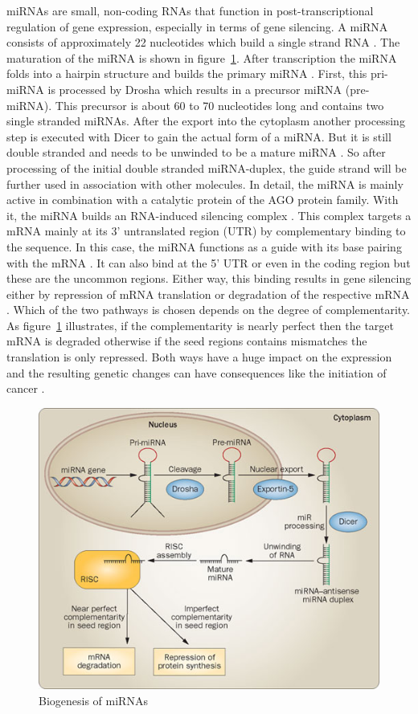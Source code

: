 \documentclass[12pt]{article}
\begin{document}
miRNAs are small, non-coding RNAs that function in post-transcriptional regulation of gene expression, especially in terms of gene silencing. A miRNA consists of approximately 22 nucleotides which build a single strand RNA \cite{Bartel}. The maturation of the miRNA is shown in figure~\ref{biogenesis}. After transcription the miRNA folds into a hairpin structure and builds the primary miRNA \cite{Macfarlane}. First, this pri-miRNA is processed by Drosha which results in a precursor miRNA (pre-miRNA). This precursor is about 60 to 70 nucleotides long and contains two single stranded miRNAs. After the export into the cytoplasm another processing step is executed with Dicer to gain the actual form of a miRNA. But it is still double stranded and needs to be unwinded to be a mature miRNA \cite{Macfarlane}. So after processing of the initial double stranded miRNA-duplex, the guide strand will be further used in association with other molecules. In detail, the miRNA is mainly active in combination with a catalytic protein of the AGO protein family. With it, the miRNA builds an RNA-induced silencing complex \cite{Ha}. This complex targets a mRNA mainly at its 3' untranslated region (UTR) by complementary binding to the sequence. In this case, the miRNA functions as a guide with its base pairing with the mRNA \cite{Macfarlane}. It can also bind at the 5' UTR or even in the coding region but these are the uncommon regions. Either way, this binding results in gene silencing either by repression of mRNA translation or degradation of the respective mRNA \cite{Enright}. Which of the two pathways is chosen depends on the degree of complementarity. As figure~\ref{biogenesis} illustrates, if the complementarity is nearly perfect then the target mRNA is degraded otherwise if the seed regions contains mismatches the translation is only repressed. Both ways have a huge impact on the expression and the resulting genetic changes can have consequences like the initiation of cancer \cite{Macfarlane}.\\

\begin{figure}[h]
\centering
\includegraphics[scale=0.45]{results/biogenesis.png}
\caption{Biogenesis of miRNAs}
\label{biogenesis}
\end{figure}  
\end{document}
